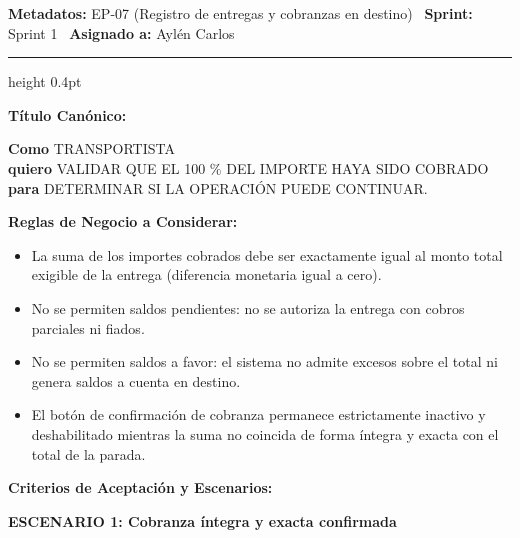 \documentclass[a4paper,9pt]{article}
\begin{document}
\begin{tcolorbox}[hucard, title={\textbf{HU-32: VALIDAR COBRO ÍNTEGRO} \hfill \scriptsize \colorbox{amberstatus}{\textbf{\ Ready for test\ }} \quad \colorbox{white}{\textcolor{primarydark}{\textbf{\ 3 pts\ }}}}]
\vspace{-1pt}
\noindent\textbf{\footnotesize Metadatos:} EP-07 (Registro de entregas y cobranzas en destino) \textbar\ \textbf{Sprint:} Sprint 1 \textbar\ \textbf{Asignado a:} Aylén Carlos\par\vspace{2pt}
\hrule height 0.4pt\par\vspace{3pt}
\noindent\textbf{\footnotesize Título Canónico:}\par\vspace{1pt}
{\small \textbf{Como} TRANSPORTISTA \\ \textbf{quiero} VALIDAR QUE EL 100 \% DEL IMPORTE HAYA SIDO COBRADO \\ \textbf{para} DETERMINAR SI LA OPERACIÓN PUEDE CONTINUAR.}\par\vspace{3pt}
\noindent\textbf{\footnotesize Reglas de Negocio a Considerar:}\par\vspace{1pt}
{\footnotesize
\begin{itemize}[leftmargin=12pt, nosep, itemsep=1.5pt, topsep=1pt]
\item La suma de los importes cobrados debe ser exactamente igual al monto total exigible de la entrega (diferencia monetaria igual a cero).
\item No se permiten saldos pendientes: no se autoriza la entrega con cobros parciales ni fiados.
\item No se permiten saldos a favor: el sistema no admite excesos sobre el total ni genera saldos a cuenta en destino.
\item El botón de confirmación de cobranza permanece estrictamente inactivo y deshabilitado mientras la suma no coincida de forma íntegra y exacta con el total de la parada.
\end{itemize}
}\par\vspace{3pt}
\noindent\textbf{\footnotesize Criterios de Aceptación y Escenarios:}\par\vspace{2pt}
{\footnotesize
\noindent\textbf{\textcolor{secondarydark}{ESCENARIO 1:  Cobranza íntegra y exacta confirmada}}\par\vspace{1pt}
}
\end{tcolorbox}
\end{document}
